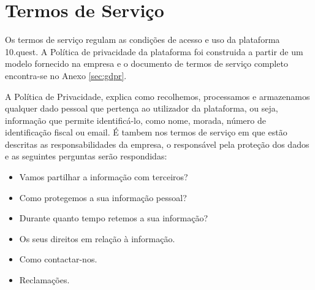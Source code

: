 \section{Termos de Serviço}

Os termos de serviço regulam as condições de acesso e uso da plataforma 10.quest. A Política de privacidade da plataforma foi construida a partir de um modelo fornecido na empresa e o documento de termos de serviço completo encontra-se no Anexo \ref{sec:gdpr}.

A Política de Privacidade, explica como recolhemos, processamos e armazenamos qualquer dado pessoal que pertença ao utilizador da plataforma, ou seja, informação que permite identificá-lo, como nome, morada, número de identificação fiscal ou email. É tambem nos termos de serviço em que estão descritas as responsabilidades da empresa, o responsável pela proteção dos dados e as seguintes perguntas serão respondidas:
\begin{itemize}
	\item Vamos partilhar a informação com terceiros?
	\item Como protegemos a sua informação pessoal?
	\item Durante quanto tempo retemos a sua informação?
	\item Os seus direitos em relação à informação.
	\item Como contactar-nos.
	\item Reclamações.
\end{itemize}




\blankpage

\glsresetall